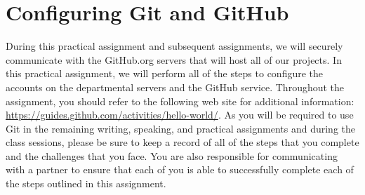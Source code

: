\section*{Configuring Git and GitHub}

During this practical assignment and subsequent assignments, we will securely communicate with the GitHub.org servers
that will host all of our projects.  In this practical assignment, we will perform all of the steps to configure the
accounts on the departmental servers and the GitHub service.  Throughout the assignment, you should refer to the
following web site for additional information: \url{https://guides.github.com/activities/hello-world/}. As you will be
required to use Git in the remaining writing, speaking, and practical assignments and during the class sessions, please
be sure to keep a record of all of the steps that you complete and the challenges that you face. You are also
responsible for communicating with a partner to ensure that each of you is able to successfully complete each of the
steps outlined in this assignment.

